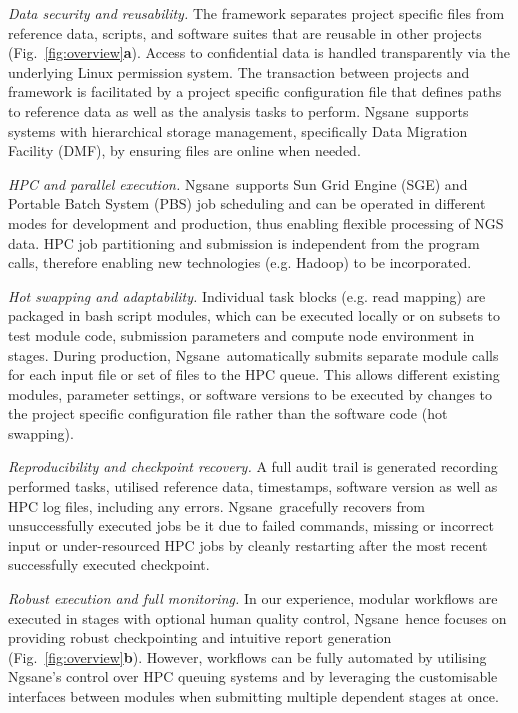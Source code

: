 \documentclass{bioinfo}
\newcommand{\prog}{{\sc Ngsane}}
\begin{document}
{\it Data security and reusability.}
The framework separates project specific files from reference data, scripts, and software suites that are reusable in other projects (Fig.~\ref{fig:overview}{\bf a}). 
Access to confidential data is handled transparently via the underlying Linux permission system.
The transaction between projects and framework is facilitated by a project specific configuration file that defines paths to reference data as well as the analysis tasks to perform. 
\prog\ supports systems with hierarchical storage management, specifically Data Migration Facility (DMF), by ensuring files are online when needed. 

{\it HPC and parallel execution.} 
\prog\ supports Sun Grid Engine (SGE) and Portable Batch System (PBS) job scheduling and can be operated in different modes for development and production, thus enabling flexible processing of NGS data. 
HPC job partitioning and submission is independent from the program calls, therefore enabling new technologies (e.g. Hadoop) to be incorporated. 

{\it Hot swapping and adaptability.}
Individual task blocks (e.g. read mapping) are packaged in bash script modules, which can be executed locally or on subsets to test module code, submission parameters and compute node environment in stages. 
During production, \prog\ automatically submits separate module calls for each input file or set of files to the HPC queue. 
This allows different existing modules, parameter settings, or software versions to be executed by changes to the project specific configuration file rather than the software code (hot swapping).

{\it Reproducibility and checkpoint recovery.}
A full audit trail is generated recording performed tasks, utilised reference data, timestamps, software version as well as HPC log files, including any errors. 
\prog\ gracefully recovers from unsuccessfully executed jobs be it due to failed commands, missing or incorrect input or under-resourced HPC jobs by cleanly restarting after the most recent successfully executed checkpoint. 

{\it Robust execution and full monitoring.}
In our experience, modular workflows are executed in stages with optional human quality control, \prog\ hence focuses on providing robust checkpointing and intuitive report generation (Fig.~\ref{fig:overview}{\bf b}).
However, workflows can be fully automated by utilising \prog's control over HPC queuing systems and by leveraging the customisable interfaces between modules when submitting multiple dependent stages at once.
\end{document}
